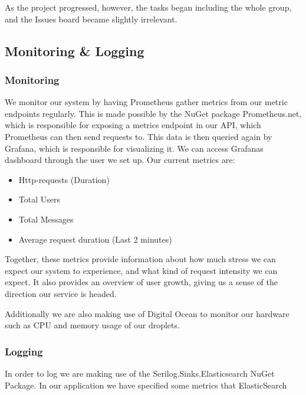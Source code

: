 \noindent As the project progressed, however, the tasks began including the whole group, and the Issues board became slightly irrelevant.

\subsection{Monitoring \& Logging}

\subsubsection{Monitoring} \label{Monitoring}

We monitor our system by having Prometheus gather metrics from our metric endpoints regularly. This is made possible by the NuGet package Prometheus.net, which is responsible for exposing a metrics endpoint in our API, which Prometheus can then send requests to. This data is then queried again by Grafana, which is responsible for visualizing it. We can access Grafanas dashboard through the user we set up. Our current metrics are:

\begin{itemize}
    \item Http-requests (Duration)
    \item Total Users
    \item Total Messages
    \item Average request duration (Last 2 minutes)
\end{itemize}

\noindent Together, these metrics provide information about how much stress we can expect our system to experience, and what kind of request intensity we can expect. It also provides an overview of user growth, giving us a sense of the direction our service is headed. 

Additionally we are also making use of Digital Ocean to monitor our hardware such as CPU and memory usage of our droplets.

\subsubsection{Logging} \label{Logging}

In order to log we are making use of the Serilog.Sinks.Elasticsearch NuGet Package. In our application we have specified some metrics that ElasticSearch 


